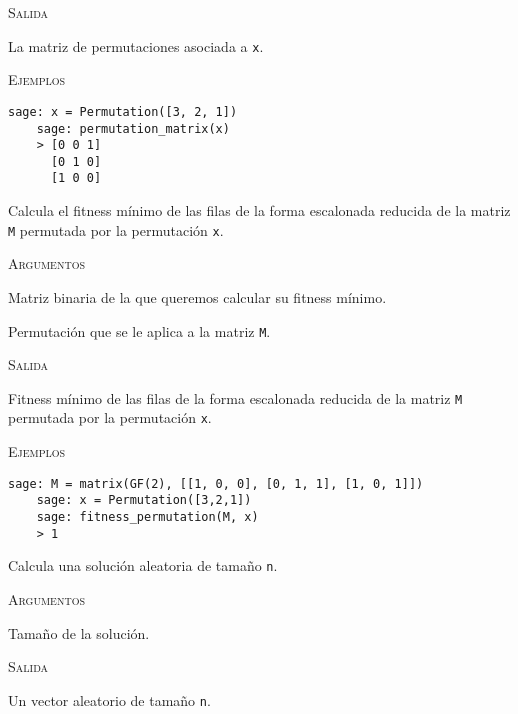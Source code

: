 \begin{description}[leftmargin=1em, font=\normalfont\ttfamily, style=nextline]
  \textsc{Salida}
  \begin{description}[font=\normalfont\ttfamily]
    \item[] La matriz de permutaciones asociada a \texttt{x}.
  \end{description}

  \textsc{Ejemplos}
  \begin{lstlisting}[gobble=4]
    sage: x = Permutation([3, 2, 1])
    sage: permutation_matrix(x)
    > [0 0 1]
      [0 1 0]
      [1 0 0]
  \end{lstlisting}

  \item[fitness\_permutation(M, x)] Calcula el fitness mínimo de las filas de la forma escalonada reducida de la matriz \texttt{M} permutada por la permutación \texttt{x}.

  \textsc{Argumentos}
  \begin{description}[font=\normalfont\ttfamily]
    \item[M] Matriz binaria de la que queremos calcular su fitness mínimo.
    \item[x] Permutación que se le aplica a la matriz \texttt{M}.
  \end{description}

  \textsc{Salida}
  \begin{description}[font=\normalfont\ttfamily]
    \item[] Fitness mínimo de las filas de la forma escalonada reducida de la matriz \texttt{M} permutada por la permutación \texttt{x}.
  \end{description}

  \textsc{Ejemplos}
  \begin{lstlisting}[gobble=4]
    sage: M = matrix(GF(2), [[1, 0, 0], [0, 1, 1], [1, 0, 1]])
    sage: x = Permutation([3,2,1])
    sage: fitness_permutation(M, x)
    > 1
  \end{lstlisting}

  \item[random\_sol(n)] Calcula una solución aleatoria de tamaño \texttt{n}.

  \textsc{Argumentos}
  \begin{description}[font=\normalfont\ttfamily]
    \item[n] Tamaño de la solución.
  \end{description}

  \textsc{Salida}
  \begin{description}[font=\normalfont\ttfamily]
    \item[] Un vector aleatorio de tamaño \texttt{n}.
  \end{description}


\end{description}
